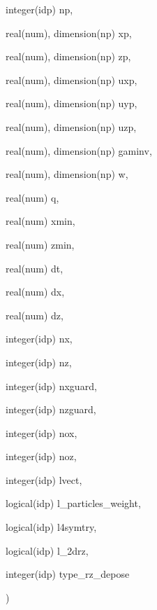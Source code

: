{\begin{DoxyParamCaption}
\item[{integer(idp)}]{np, }
\item[{real(num), dimension(np)}]{xp, }
\item[{real(num), dimension(np)}]{zp, }
\item[{real(num), dimension(np)}]{uxp, }
\item[{real(num), dimension(np)}]{uyp, }
\item[{real(num), dimension(np)}]{uzp, }
\item[{real(num), dimension(np)}]{gaminv, }
\item[{real(num), dimension(np)}]{w, }
\item[{real(num)}]{q, }
\item[{real(num)}]{xmin, }
\item[{real(num)}]{zmin, }
\item[{real(num)}]{dt, }
\item[{real(num)}]{dx, }
\item[{real(num)}]{dz, }
\item[{integer(idp)}]{nx, }
\item[{integer(idp)}]{nz, }
\item[{integer(idp)}]{nxguard, }
\item[{integer(idp)}]{nzguard, }
\item[{integer(idp)}]{nox, }
\item[{integer(idp)}]{noz, }
\item[{integer(idp)}]{lvect, }
\item[{logical(idp)}]{l\+\_\+particles\+\_\+weight, }
\item[{logical(idp)}]{l4symtry, }
\item[{logical(idp)}]{l\+\_\+2drz, }
\item[{integer(idp)}]{type\+\_\+rz\+\_\+depose}
\end{DoxyParamCaption}
)}\hypertarget{current__deposition__2d_8_f90_afe150c6f9a46d86a94382abd2ad2dee5}{}\label{current__deposition__2d_8_f90_afe150c6f9a46d86a94382abd2ad2dee5}

